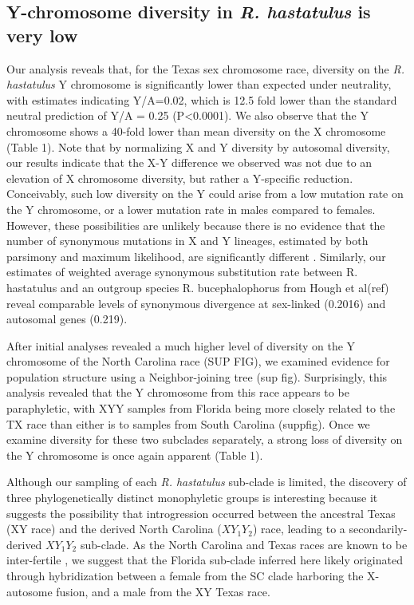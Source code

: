 \documentclass[9pt,twocolumn,twoside]{gsajnl}
\begin{document}
\subsection*{Y-chromosome diversity in \textit{R. hastatulus} is very low}
Our analysis reveals that, for the Texas sex chromosome race, diversity on the \textit{R. hastatulus} Y chromosome is significantly lower than expected under neutrality, with estimates indicating Y/A=0.02, which is 12.5 fold lower than the standard neutral prediction of Y/A = 0.25 (P<0.0001). We also observe that the Y chromosome shows a 40-fold lower than mean diversity on the X chromosome (Table 1). Note that by normalizing X and Y diversity by autosomal diversity, our results indicate that the X-Y difference we observed was not due to an elevation of X chromosome diversity, but rather a Y-specific reduction. Conceivably, such low diversity on the Y could arise from a low mutation rate on the Y chromosome, or a lower mutation rate in males compared to females. However, these possibilities are unlikely because there is no evidence that the number of synonymous mutations in X and Y lineages, estimated by both parsimony and maximum likelihood, are significantly different \citep{hough2014}. Similarly, our estimates of weighted average synonymous substitution rate between R. hastatulus and an outgroup species R. bucephalophorus from Hough et al(ref) reveal comparable levels of synonymous divergence at sex-linked (0.2016) and autosomal genes (0.219).


After initial analyses revealed a much higher level of diversity on the Y chromosome of the North Carolina race (SUP FIG), we examined evidence for population structure using a Neighbor-joining tree (sup fig). Surprisingly, this analysis revealed that the Y chromosome from this race appears to be paraphyletic, with XYY samples from Florida being more closely related to the TX race than either is to samples from South Carolina (suppfig). Once we examine diversity for these two subclades separately, a strong loss of diversity on the Y chromosome is once again apparent (Table 1).

Although our sampling of each \textit{R. hastatulus} sub-clade is limited, the discovery of three phylogenetically distinct monophyletic groups is interesting because it suggests the possibility that introgression occurred between the ancestral Texas (XY race) and the derived North Carolina ($XY_{1}Y_{2}$) race, leading to a secondarily-derived $XY_{1}Y_{2}$ sub-clade. As the North Carolina and Texas races are known to be inter-fertile \citep{smith1964evolving}, we suggest that the Florida sub-clade inferred here likely originated through hybridization between a female from the SC clade harboring the X-autosome fusion, and a male from the XY Texas race.
\end{document}
